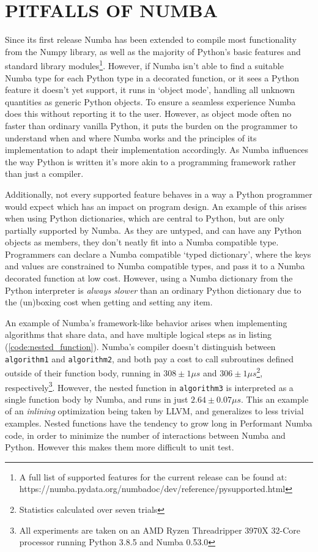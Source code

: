 \documentclass{IEEEcsmag}
\begin{document}


\section{PITFALLS OF NUMBA}\label{sec:pitfalls}

Since its first release Numba has been extended to compile most functionality from the Numpy library, as well as the majority of Python's basic features and standard library modules\footnote{A full list of supported features for the current release can be found at: https://numba.pydata.org/numba\-doc/dev/reference/pysupported.html}. However, if Numba isn't able to find a suitable Numba type for each Python type in a decorated function, or it sees a Python feature it doesn't yet support, it runs in `object mode', handling all unknown quantities as generic Python objects. To ensure a seamless experience Numba does this without reporting it to the user. However, as object mode often no faster than ordinary vanilla Python, it puts the burden on the programmer to understand when and where Numba works and the principles of its implementation to adapt their implementation accordingly. As Numba influences the way Python is written it's more akin to a programming framework rather than just a compiler.

Additionally, not every supported feature behaves in a way a Python programmer would expect which has an impact on program design. An example of this arises when using Python dictionaries, which are central to Python, but are only partially supported by Numba. As they are untyped, and can have any Python objects as members, they don't neatly fit into a Numba compatible type. Programmers can declare a Numba compatible `typed dictionary', where the keys and values are constrained to Numba compatible types, and pass it to a Numba decorated function at low cost. However, using a Numba dictionary from the Python interpreter is \textit{always slower} than an ordinary Python dictionary due to the (un)boxing cost when getting and setting any item.

An example of Numba's framework-like behavior arises when implementing algorithms that share data, and have multiple logical steps as in listing (\ref{code:nested_function}). Numba's compiler doesn't distinguish between \lstinline{algorithm1} and \lstinline{algorithm2}, and both pay a cost to call subroutines defined outside of their function body, running in $308 \pm 1 \mu s$ and $306 \pm 1 \mu s$\footnote{Statistics calculated over seven trials}, respectively\footnote{All experiments are taken on an AMD Ryzen Threadripper 3970X 32-Core processor running Python 3.8.5 and Numba 0.53.0}. However, the nested function in \lstinline{algorithm3} is interpreted as a single function body by Numba, and runs in just $2.64 \pm 0.07 \mu s$. This an example of an \textit{inlining} optimization being taken by LLVM, and generalizes to less trivial examples. Nested functions have the tendency to grow long in Performant Numba code, in order to minimize the number of interactions between Numba and Python. However this makes them more difficult to unit test.
\end{document}
